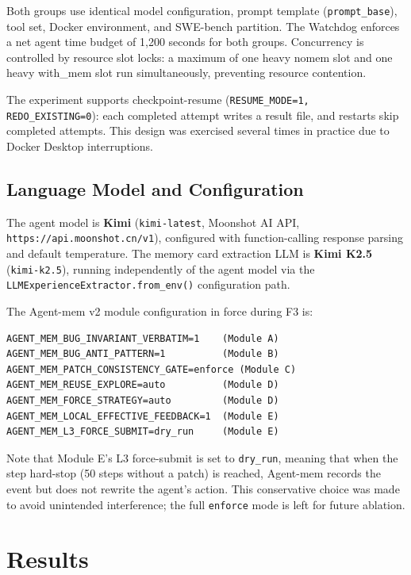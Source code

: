 \documentclass{article}
\begin{document}
Both groups use identical model configuration, prompt template (\texttt{prompt\_base}), tool set, Docker environment, and SWE-bench partition. The Watchdog enforces a net agent time budget of 1,200 seconds for both groups. Concurrency is controlled by resource slot locks: a maximum of one heavy nomem slot and one heavy with\_mem slot run simultaneously, preventing resource contention.

The experiment supports checkpoint-resume (\texttt{RESUME\_MODE=1, REDO\_EXISTING=0}): each completed attempt writes a result file, and restarts skip completed attempts. This design was exercised several times in practice due to Docker Desktop interruptions.

\subsection{Language Model and Configuration}

The agent model is \textbf{Kimi} (\texttt{kimi-latest}, Moonshot AI API, \texttt{https://api.moonshot.cn/v1}), configured with function-calling response parsing and default temperature. The memory card extraction LLM is \textbf{Kimi K2.5} (\texttt{kimi-k2.5}), running independently of the agent model via the \texttt{LLMExperienceExtractor.from\_env()} configuration path.

The Agent-mem v2 module configuration in force during F3 is:
\begin{verbatim}
AGENT_MEM_BUG_INVARIANT_VERBATIM=1    (Module A)
AGENT_MEM_BUG_ANTI_PATTERN=1          (Module B)
AGENT_MEM_PATCH_CONSISTENCY_GATE=enforce (Module C)
AGENT_MEM_REUSE_EXPLORE=auto          (Module D)
AGENT_MEM_FORCE_STRATEGY=auto         (Module D)
AGENT_MEM_LOCAL_EFFECTIVE_FEEDBACK=1  (Module E)
AGENT_MEM_L3_FORCE_SUBMIT=dry_run     (Module E)
\end{verbatim}

Note that Module E's L3 force-submit is set to \texttt{dry\_run}, meaning that when the step hard-stop (50 steps without a patch) is reached, Agent-mem records the event but does not rewrite the agent's action. This conservative choice was made to avoid unintended interference; the full \texttt{enforce} mode is left for future ablation.

\section{Results}
\end{document}

